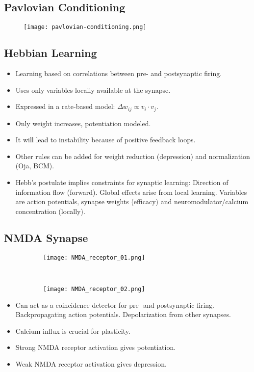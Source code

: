 \documentclass[main]{subfiles}
\begin{document}
\subsection{Pavlovian Conditioning}
\begin{figure}
	\texttt{[image: pavlovian-conditioning.png]}
\end{figure}

\subsection{Hebbian Learning}
\begin{itemize}[noitemsep,nolistsep]
	\item Learning based on correlations between pre- and postsynaptic firing.
	\item Uses only variables locally available at the synapse.
	\item Expressed in a rate-based model: $\Delta w_{ij}\propto v_i\cdot v_j$.
	\item Only weight increases, potentiation modeled.
	\item It will lead to instability because of positive feedback loops.
	\item Other rules can be added for weight reduction (depression) and normalization (Oja, BCM).
	\item Hebb's postulate implies constraints for synaptic learning:
	\subitem Direction of information flow (forward).
	\subitem Global effects arise from local learning.
	\subitem Variables are action potentials, synapse weights (efficacy) and neuromodulator/calcium concentration (locally).
\end{itemize}

\subsection{NMDA Synapse}
\begin{figure}[H]
	\centering
	\begin{subfigure}[b]{0.5\textwidth}
    	\centering
		\texttt{[image: NMDA\_receptor\_01.png]}
	\end{subfigure}%
	~
	\begin{subfigure}[b]{0.5\textwidth}
		\centering
		\texttt{[image: NMDA\_receptor\_02.png]}
	\end{subfigure}
\end{figure}
\begin{itemize}[noitemsep,nolistsep]
	\item Can act as a coincidence detector for pre- and postsynaptic firing.
	\subitem Backpropagating action potentials.
	\subitem Depolarization from other synapses.
	\item Calcium influx is crucial for plasticity.
	\item Strong NMDA receptor activation gives potentiation.
	\item Weak NMDA receptor activation gives depression.
\end{itemize}
\end{document}
